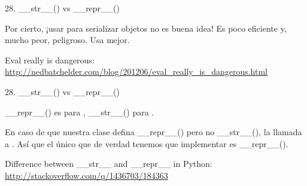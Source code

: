 \begin{frame}{28. \_\_str\_\_() vs \_\_repr\_\_()}
  \begin{alertblock}{}
    \centering
    Por cierto, ¡usar  para serializar
    objetos no es buena idea! Es poco eficiente y, mucho peor,
    peligroso. Usa  mejor.
  \end{alertblock}

  \small
  \begin{block}
    {\centering Eval really is dangerous:}
    \centering \url{http://nedbatchelder.com/blog/201206/eval_really_is_dangerous.html}
  \end{block}
\end{frame}

\begin{frame}{28. \_\_str\_\_() vs \_\_repr\_\_()}
  \small
  \begin{alertblock}{}
    \centering
    \_\_repr\_\_() es para ,
    \_\_str\_\_() para .
  \end{alertblock}

  \begin{block}{}
    \centering
    En caso de que nuestra clase defina \_\_repr\_\_() pero no
    \_\_str\_\_(), la llamada a . Así que el único que de verdad tenemos que
    implementar es \_\_repr\_\_().
  \end{block}

  \begin{block}
    {\centering Difference between \_\_str\_\_ and \_\_repr\_\_ in Python:}
    \centering \url{http://stackoverflow.com/q/1436703/184363}
  \end{block}
\end{frame}

